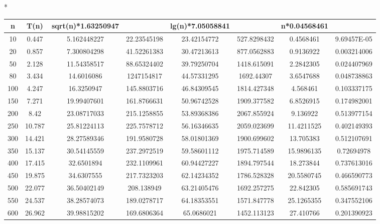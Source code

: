 \documentclass{article}
\begin{document}
    \begin{flushleft}
        \begin{adjustbox}{width=1.1\textwidth,center=\textwidth}
        *\begin{tabular}{|c|c|c|c|c|c|c|c|}
        \hline
        {n} & {T(n)} & {sqrt(n)*1.63250947} &{} & {lg(n)*7.05058841} &{} &{n*0.04568461}&{}\\
        \hline
        10 &	0.447&	5.162448227&	22.23545198&	23.42154772&	527.8298432&	0.4568461&	9.69457E-05\\
        \hline
        20	&0.857&	7.300804298&	41.52261383&	30.47213613&	877.0562883&	0.9136922&	0.003214006\\
        \hline
        50	&2.128	&11.54358517	&88.65324402	&39.79250704	&1418.615091	&2.2842305	&0.024407969\\
        \hline
        80	&3.434&	14.6016086&	1247154817&	44.57331295&	1692.44307&	3.6547688&	0.048738863\\
        \hline
        100	&4.247	&16.3250947	&145.8803716	&46.84309545	&1814.427348	&4.568461	&0.103337175\\
        \hline
        150	&7.271&	19.99407601&	161.8766631&	50.96742528&	1909.377582&	6.8526915&	0.174982001\\
        \hline
        200	&8.42&	23.08717033&	215.1258855&	53.89368386&	2067.855924&	9.136922&	0.513977154\\
        \hline
        250	&10.787	&25.81224113	&225.7578712	&56.16346635	&2059.023699	&11.4211525	&0.402149393\\
        \hline
        300	&14.421&	28.27589346&	191.9580728&	58.01801369&	1900.699602&	13.705383&	0.512107691\\
        \hline
        350	&15.137&	30.54145559&	237.2972519&	59.58601112&	1975.714589&	15.9896135&	0.72694978\\
        \hline
        400	&17.415	&32.6501894	&232.1109961	&60.94427227	&1894.797544	&18.273844	&0.737613016\\
        \hline
        450	&19.875&	34.6307555&	217.7323203&	62.14234352&	1786.528328&	20.5580745&	0.466590773\\
        \hline
        500	&22.077	&36.50402149	&208.138949	&63.21405476	&1692.257275	&22.842305	&0.585691743\\
        \hline
        550	&24.537	&38.28574073&	189.0278717&	64.18353551&	1571.847778&	25.1265355&	0.347552106\\
        \hline
        600	&26.962	&39.98815202	&169.6806364	&65.0686021	&1452.113123	&27.410766	&0.201390923\\

\end{tabular}
\end{adjustbox}
\end{flushleft}
\end{document}
